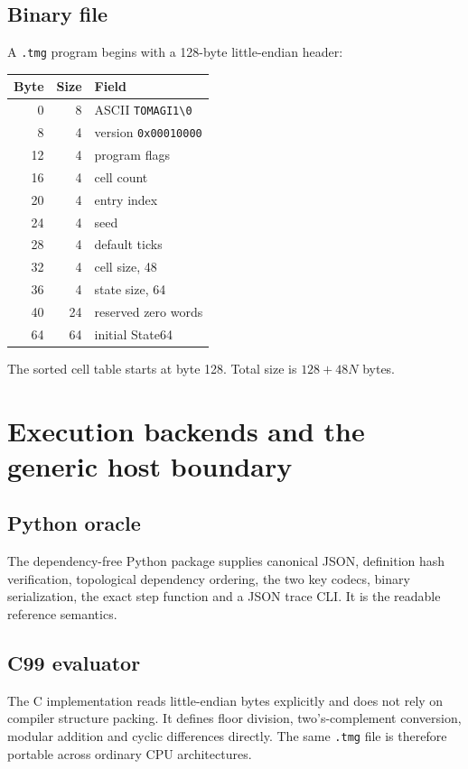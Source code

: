 \documentclass[11pt,a4paper]{article}
\newcommand{\code}[1]{\texttt{#1}}
\begin{document}
\subsection{Binary file}
A \code{.tmg} program begins with a 128-byte little-endian header:
\begin{center}
\begin{tabular}{@{}rrl@{}}
\toprule
Byte & Size & Field\\
\midrule
0 & 8 & ASCII \code{TOMAGI1\textbackslash0}\\
8 & 4 & version \code{0x00010000}\\
12 & 4 & program flags\\
16 & 4 & cell count\\
20 & 4 & entry index\\
24 & 4 & seed\\
28 & 4 & default ticks\\
32 & 4 & cell size, 48\\
36 & 4 & state size, 64\\
40 & 24 & reserved zero words\\
64 & 64 & initial State64\\
\bottomrule
\end{tabular}
\end{center}
The sorted cell table starts at byte 128. Total size is $128+48N$ bytes.




\section{Execution backends and the generic host boundary}

\subsection{Python oracle}
The dependency-free Python package supplies canonical JSON, definition hash verification, topological dependency ordering, the two key codecs, binary serialization, the exact step function and a JSON trace CLI. It is the readable reference semantics.

\subsection{C99 evaluator}
The C implementation reads little-endian bytes explicitly and does not rely on compiler structure packing. It defines floor division, two's-complement conversion, modular addition and cyclic differences directly. The same \code{.tmg} file is therefore portable across ordinary CPU architectures.
\end{document}
